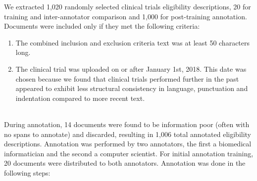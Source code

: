 \documentclass[../main.tex]{subfiles}
\begin{document}
\noindent We extracted 1,020 randomly selected clinical trials eligibility descriptions, 20 for training and inter-annotator comparison and 1,000 for post-training annotation. Documents were included only if they met the following criteria:
\begin{enumerate}
    \item The combined inclusion and exclusion criteria text was at least 50 characters long.
    \item The clinical trial was uploaded on or after January 1st, 2018. This date was chosen because we found that clinical trials performed further in the past appeared to exhibit less structural consistency in language, punctuation and indentation compared to more recent text.
\end{enumerate}
\\ 
\noindent During annotation, 14 documents were found to be information poor (often with no spans to annotate) and discarded, resulting in 1,006 total annotated eligibility descriptions. Annotation was performed by two annotators, the first a biomedical informatician and the second a computer scientist. For initial annotation training, 20 documents were distributed to both annotators. Annotation was done in the following steps:
\end{document}
